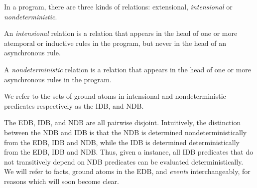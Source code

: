 In a \lang program, there are three kinds of relations:
extensional, {\em intensional} or {\em nondeterministic}.

\begin{definition}
%
An \emph{intensional} relation is a relation that appears
in the head of one or more atemporal or inductive rules in the program, but
never in the head of an asynchronous rule.~
%
\end{definition}
\begin{definition}
%
A \emph{nondeterministic} relation is a relation that
appears in the head of one or more asynchronous rules in the program.
%
\end{definition}
We refer to the sets of ground atoms in intensional and nondeterministic
predicates respectively as the IDB, and NDB.

The EDB, IDB, and NDB are all pairwise disjoint.  Intuitively, the distinction
between the NDB and IDB is that the NDB is determined nondeterministically~ from
the EDB, IDB and NDB, while the IDB is determined deterministically from the
EDB, IDB and NDB.  Thus, given a \lang instance, all IDB predicates that do
not transitively depend on NDB predicates can be evaluated deterministically.
We will refer to facts, ground atoms in the EDB, and \emph{events}
interchangeably, for reasons which will soon become clear.


